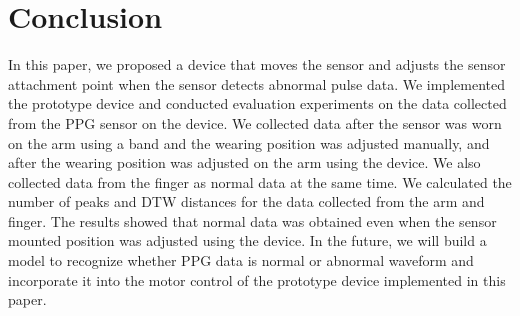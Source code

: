 \documentclass[sigconf]{acmart}
\begin{document}
\section{Conclusion}
\label{sec:conclution}
In this paper, we proposed a device that moves the sensor and adjusts the sensor attachment point when the sensor detects abnormal pulse data. We implemented the prototype device and conducted evaluation experiments on the data collected from the PPG sensor on the device. We collected data after the sensor was worn on the arm using a band and the wearing position was adjusted manually, and after the wearing position was adjusted on the arm using the device. We also collected data from the finger as normal data at the same time. We calculated the number of peaks and DTW distances for the data collected from the arm and finger. The results showed that normal data was obtained even when the sensor mounted position was adjusted using the device. In the future, we will build a model to recognize whether PPG data is normal or abnormal waveform and incorporate it into the motor control of the prototype device implemented in this paper.




\end{document}
